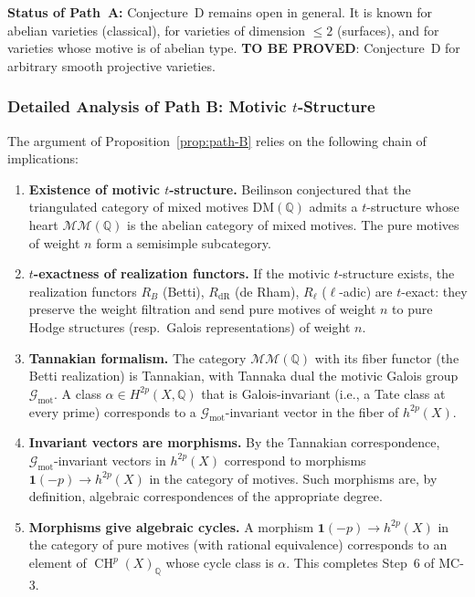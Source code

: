 \documentclass[11pt]{article}
\theoremstyle{definition}
\DeclareMathOperator{\CH}{CH}
\begin{document}
\noindent
\textbf{Status of Path~A:} Conjecture~D remains open in general.  It is
known for abelian varieties (classical), for varieties of dimension $\leq 2$
(surfaces), and for varieties whose motive is of abelian type.
\textbf{TO BE PROVED}: Conjecture~D for arbitrary smooth projective
varieties.

\subsubsection{Detailed Analysis of Path B: Motivic $t$-Structure}
\label{sec:path-B-detail}

The argument of Proposition~\ref{prop:path-B} relies on the following
chain of implications:

\begin{enumerate}[label=\textbf{(B\arabic*)}]
  \item \textbf{Existence of motivic $t$-structure.}
    Beilinson conjectured \cite{Beilinson} that the triangulated category
    of mixed motives $\mathrm{DM}(\mathbb{Q})$ admits a $t$-structure
    whose heart $\mathcal{MM}(\mathbb{Q})$ is the abelian category of mixed
    motives.  The pure motives of weight $n$ form a semisimple subcategory.

  \item \textbf{$t$-exactness of realization functors.}
    If the motivic $t$-structure exists, the realization functors
    $R_B$ (Betti), $R_{\mathrm{dR}}$ (de Rham), $R_\ell$ ($\ell$-adic)
    are $t$-exact: they preserve the weight filtration and send pure
    motives of weight $n$ to pure Hodge structures (resp.\ Galois
    representations) of weight $n$.

  \item \textbf{Tannakian formalism.}
    The category $\mathcal{MM}(\mathbb{Q})$ with its fiber functor
    (the Betti realization) is Tannakian, with Tannaka dual the motivic
    Galois group $\mathcal{G}_{\mathrm{mot}}$.  A class
    $\alpha \in H^{2p}(X, \mathbb{Q})$ that is Galois-invariant (i.e.,
    a Tate class at every prime) corresponds to a
    $\mathcal{G}_{\mathrm{mot}}$-invariant vector in the fiber of
    $h^{2p}(X)$.

  \item \textbf{Invariant vectors are morphisms.}
    By the Tannakian correspondence,
    $\mathcal{G}_{\mathrm{mot}}$-invariant vectors in $h^{2p}(X)$
    correspond to morphisms $\mathbf{1}(-p) \to h^{2p}(X)$ in the
    category of motives.  Such morphisms are, by definition, algebraic
    correspondences of the appropriate degree.

  \item \textbf{Morphisms give algebraic cycles.}
    A morphism $\mathbf{1}(-p) \to h^{2p}(X)$ in the category of pure
    motives (with rational equivalence) corresponds to an element of
    $\CH^p(X)_{\mathbb{Q}}$ whose cycle class is $\alpha$.  This
    completes Step~6 of MC-3.
\end{enumerate}
\end{document}
